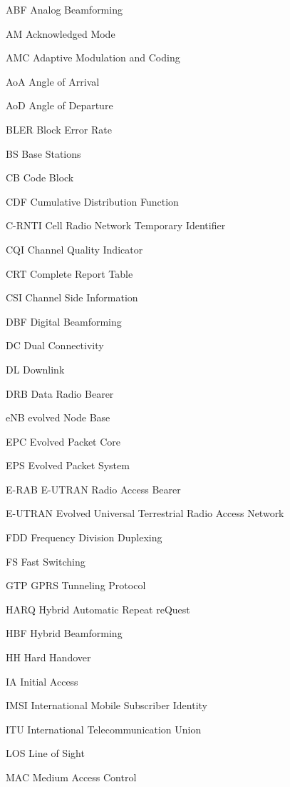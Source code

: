 
\begin{abbreviations}

\item[ABF] Analog Beamforming
\item[AM] Acknowledged Mode
\item[AMC] Adaptive Modulation and Coding
\item[AoA] Angle of Arrival
\item[AoD] Angle of Departure
\item[BLER] Block Error Rate
\item[BS] Base Stations
\item[CB] Code Block
\item[CDF] Cumulative Distribution Function
\item[C-RNTI] Cell Radio Network Temporary Identifier
\item[CQI] Channel Quality Indicator
\item[CRT] Complete Report Table
\item[CSI] Channel Side Information
\item[DBF] Digital Beamforming
\item[DC] Dual Connectivity
\item[DL] Downlink
\item[DRB] Data Radio Bearer
\item[eNB] evolved Node Base
\item[EPC] Evolved Packet Core
\item[EPS] Evolved Packet System
\item[E-RAB] E-UTRAN Radio Access Bearer
\item[E-UTRAN] Evolved Universal Terrestrial Radio Access Network
\item[FDD] Frequency Division Duplexing
\item[FS] Fast Switching
\item[GTP] GPRS Tunneling Protocol
\item[HARQ] Hybrid Automatic Repeat reQuest
\item[HBF] Hybrid Beamforming
\item[HH] Hard Handover
\item[IA] Initial Access
\item[IMSI] International Mobile Subscriber Identity
\item[ITU] International Telecommunication Union
\item[LOS] Line of Sight
\item[MAC] Medium Access Control

\end{abbreviations}
